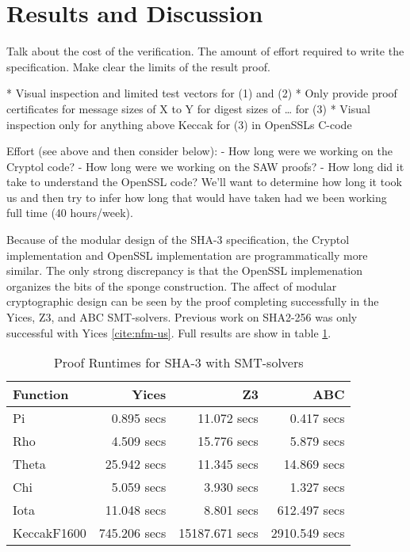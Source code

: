 \section{Results and Discussion}\label{sec:results}

Talk about the cost of the verification. The amount of effort required to write the specification. Make clear the limits of the result proof.

* Visual inspection and limited test vectors for (1) and (2)
* Only provide proof certificates for message sizes of X to Y for digest sizes of … for (3)
* Visual inspection only for anything above Keccak for (3) in OpenSSLs C-code

Effort (see above and then consider below):
 - How long were we working on the Cryptol code?
 - How long were we working on the SAW proofs?
 - How long did it take to understand the OpenSSL code?
We'll want to determine how long it took us and then try to infer how long that would have taken had we been working full time (40 hours/week).

Because of the modular design of the SHA-3 specification, the Cryptol implementation and OpenSSL implementation are programmatically more similar. The only strong discrepancy is that the OpenSSL implemenation organizes the bits of the sponge construction. The affect of modular cryptographic design can be seen by the proof completing successfully in the Yices, Z3, and ABC SMT-solvers. Previous work on SHA2-256 was only successful with Yices \ref{cite:nfm-us}. Full results are show in table \ref{finaltable}. 

\begin{table}[b]
\caption{Proof Runtimes for SHA-3 with SMT-solvers}\label{finaltable}
\setlength{\tabcolsep}{13.5pt}
\begin{tabular}{|l|r|r|r|}
\hline
\textbf{Function} & \textbf{Yices} & \textbf{Z3} & \textbf{ABC} \\
\hline
Pi          &   0.895 secs &    11.072 secs &    0.417 secs \\
Rho         &   4.509 secs &    15.776 secs &    5.879 secs \\
Theta       &  25.942 secs &    11.345 secs &   14.869 secs \\
Chi         &   5.059 secs &     3.930 secs &    1.327 secs \\
Iota        &  11.048 secs &     8.801 secs &  612.497 secs \\
KeccakF1600 & 745.206 secs & 15187.671 secs & 2910.549 secs \\
\hline
\end{tabular}
\end{table}